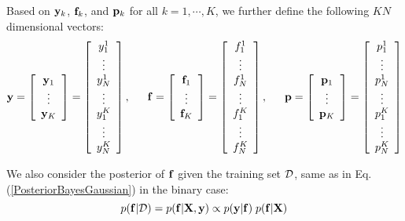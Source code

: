 \documentclass{article}
\begin{document}
Based on ${\bf y}_k$, ${\bf f}_k$, and ${\bf p}_k$ for all $k=1,\cdots,K$,
we further define the following $KN$ dimensional vectors:
\begin{equation}
  {\bf y}=\left[\begin{array}{c}{\bf y}_1\\\vdots\\{\bf y}_K\end{array}\right]
  =\left[\begin{array}{c}y_1^1\\\vdots\\y_N^1\\\vdots\\y_1^K\\\vdots\\y_N^K\end{array}\right],\,\;\;\;\;\;
  {\bf f}=\left[\begin{array}{c}{\bf f}_1\\\vdots\\{\bf f}_K\end{array}\right]
  =\left[\begin{array}{c}f_1^1\\\vdots\\f_N^1\\\vdots\\f_1^K\\\vdots\\f_N^K\end{array}\right],\,\;\;\;\;\;
  {\bf p}=\left[\begin{array}{c}{\bf p}_1\\\vdots\\{\bf p}_K\end{array}\right]
  =\left[\begin{array}{c}p_1^1\\\vdots\\p_N^1\\\vdots\\p_1^K\\\vdots\\p_N^K\end{array}\right]
\end{equation}

We also consider the posterior of ${\bf f}$ given the training 
set ${\cal D}$, same as in Eq. (\ref{PosteriorBayesGaussian}) in
the binary case:
\begin{equation}
  p({\bf f}|{\cal D})=p({\bf f}|{\bf X},{\bf y})
  \propto p({\bf y}|{\bf f})\; p({\bf f}|{\bf X})
\end{equation}
\end{document}
